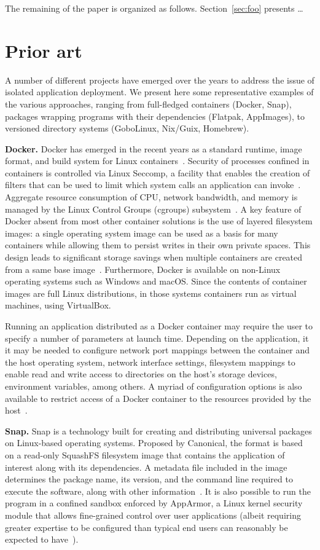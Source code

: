 \documentclass[sigplan, anonymous, 10pt]{acmart}
\begin{document}
The remaining of the paper is organized as follows. Section~\ref{sec:foo} presents \ldots

\section{Prior art}
A number of different projects have emerged over the years to address the issue of
isolated application deployment. We present here some representative examples of
the various approaches, ranging from full-fledged containers (Docker, Snap),
packages wrapping programs with their dependencies (Flatpak, AppImages),
to versioned directory systems (GoboLinux, Nix/Guix, Homebrew).

\textbf{Docker.}
Docker has emerged in the recent years as a standard runtime, image format, and build
system for Linux containers~\cite{fink2014:docker}. Security of processes confined in
containers is controlled via Linux Seccomp, a facility that enables the creation of
filters that can be used to limit which system calls an application can
invoke~\cite{lwn2015:seccomp}.
Aggregate resource consumption of CPU, network bandwidth, and memory is managed by the Linux
Control Groups (cgroups) subsystem~\cite{brown2014:cgroups}. A key feature of Docker
absent from most other container solutions is the use of layered filesystem images:
a single operating system image can be used as a basis for many containers while allowing
them to persist writes in their own private spaces. This design leads to significant
storage savings when multiple containers are created from a same base
image~\cite{felter2015:comparison}.
Furthermore, Docker is available on non-Linux operating systems such as Windows and
macOS. Since the contents of container images are full Linux distributions, in
those systems containers run as virtual machines, using VirtualBox.

Running an application distributed as a Docker container may require the user to
specify a number of parameters at launch time. Depending on the application, it
it may be needed to configure network port mappings between the container and the
host operating system, network interface settings, filesystem mappings to enable
read and write access to directories on the host's storage devices, environment
variables, among others. A myriad of configuration options is also available to
restrict access of a Docker container to the resources provided by the
host~\cite{krochmalski2016:docker}.

\textbf{Snap.}
Snap is a technology built for creating and distributing universal packages on Linux-based
operating systems. Proposed by Canonical, the format is based on a read-only SquashFS filesystem
image that contains the application of interest along with its dependencies. A metadata file
included in the image determines the package name, its version, and the command line required
to execute the software, along with other information~\cite{canonical2011:snapcraft}.
It is also possible to run the program in a confined sandbox enforced by AppArmor, a Linux kernel
security module that allows fine-grained control over user applications (albeit requiring greater
expertise to be configured than typical end users can reasonably be expected to
have~\cite{schreuders2011:empowering}).
\end{document}
